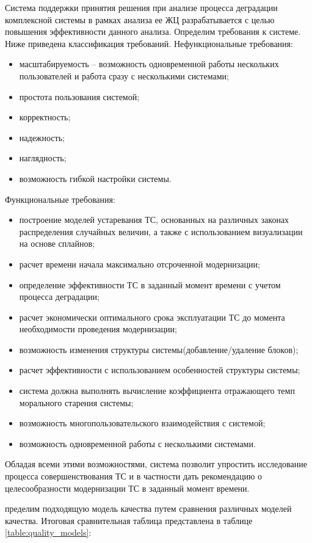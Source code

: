 Система поддержки принятия решения при анализе процесса деградации комплексной системы в рамках анализа ее ЖЦ разрабатывается с целью повышения эффективности данного анализа. 
Определим требования к системе. Ниже приведена классификация требований.
Нефункциональные требования:
\begin{itemize}
    \item масштабируемость – возможность одновременной работы нескольких пользователей и работа сразу с несколькими системами;
    \item простота пользования системой; 
    \item корректность;
    \item надежность;
    \item наглядность;
    \item возможность гибкой настройки системы.
\end{itemize}
Функциональные требования:
\begin{itemize}
    \item построение моделей устаревания ТС, основанных на различных законах распределения случайных величин, а также с использованием визуализации на основе сплайнов;
    \item расчет времени начала максимально отсроченной модернизации;
    \item определение эффективности ТС в заданный момент времени с учетом процесса деградации;
    \item расчет экономически оптимального срока эксплуатации ТС до момента необходимости проведения модернизации;
    \item возможность изменения структуры системы(добавление/удаление блоков);
    \item расчет эффективности с использованием особенностей структуры системы;
    \item система должна выполнять вычисление коэффициента отражающего темп морального старения системы;
    \item возможность многопользовательского взаимодействия с системой;
    \item возможность одновременной работы с несколькими системами.
\end{itemize}

Обладая всеми этими возможностями, система позволит упростить исследование процесса совершенствования ТС и в частности дать рекомендацию о целесообразности модернизации ТС в заданный момент времени.

пределим подходящую модель качества путем сравнения различных моделей качества. 
Итоговая сравнительная таблица представлена в таблице \ref{table:quality_models}:

